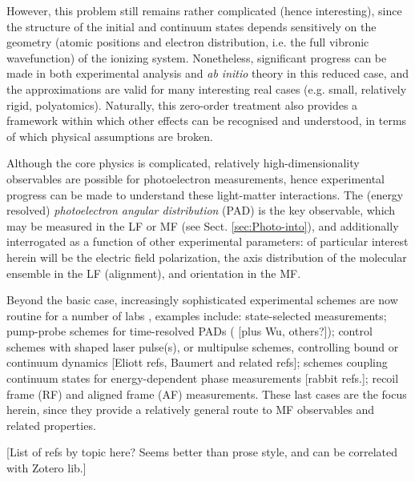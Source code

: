 However, this problem still remains rather complicated (hence interesting), since the structure of the initial and continuum states depends sensitively on the geometry (atomic positions and electron distribution, i.e. the full vibronic wavefunction) of the ionizing system. Nonetheless, significant progress can be made in both experimental analysis and \textit{ab initio} theory in this reduced case, and the approximations are valid for many interesting real cases (e.g. small, relatively rigid, polyatomics). Naturally, this zero-order treatment also provides a framework within which other effects can be recognised and understood, in terms of which physical assumptions are broken.

Although the core physics is complicated, relatively high-dimensionality observables are possible for photoelectron measurements, hence experimental progress can be made to understand these light-matter interactions. The (energy resolved) \textit{photoelectron angular distribution} (PAD) is the key observable, which may be measured in the LF or MF (see Sect. \ref{sec:Photo-into}), and additionally interrogated as a function of other experimental parameters: of particular interest herein will be the electric field polarization, the axis distribution of the molecular ensemble in the LF (alignment), and orientation in the MF. 

Beyond the basic case, increasingly sophisticated experimental schemes are now routine for a number of labs \cite{Reid2012}, examples include: state-selected measurements; pump-probe schemes for time-resolved PADs (\cite{Seideman2002} [plus Wu, others?]); control schemes with shaped laser pulse(s), or multipulse schemes, controlling bound or continuum dynamics [Eliott refs, Baumert and related refs]; schemes coupling continuum states for energy-dependent phase measurements [rabbit refs.]; recoil frame (RF) and aligned frame (AF) measurements. These last cases are the focus herein, since they provide a relatively general route to MF observables and related properties.

[List of refs by topic here? Seems better than prose style, and can be correlated with Zotero lib.]

